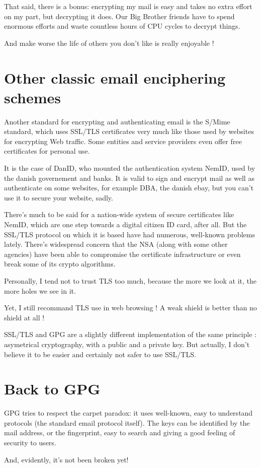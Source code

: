 That said, there is a bonus: encrypting my mail is easy and takes no
extra effort on my part, but decrypting it does. Our Big Brother friends
have to spend enormous efforts and waste countless hours of CPU cycles
to decrypt things.

\begin{quoting}
And make worse the life of others you don't like is really enjoyable !
\end{quoting}

\section{Other classic email enciphering schemes}\label{other-classic-email-enciphering-schemes}

Another standard for encrypting and authenticating email is the S/Mime standard, which uses SSL/TLS certificates very much like those used by
websites for encrypting Web traffic. Some entities and service providers even offer free certificates for personal use.

It is the case of DanID, who mounted the authentication system NemID, used by the danish governement and banks. It is valid to sign and
encrypt mail as well as authenticate on some websites, for example DBA, the danish ebay, but you can't use it to secure your website, sadly.

There's much to be said for a nation-wide system of secure certificates like NemID, which are one step towards a digital citizen ID card, after
all. But the SSL/TLS protocol on which it is based have had numerous, well-known problems lately. There's widespread concern that the NSA
(along with some other agencies) have been able to compromise the certificate infrastructure or even break some of its crypto algorithms.

Personally, I tend not to trust TLS too much, because the more we look at it, the more holes we see in it.

\begin{notice}
	Yet, I still recommand TLS use in web browsing ! A weak shield is better than no shield at all !
\end{notice}

SSL/TLS and GPG are a slightly different implementation of the same principle : asymetrical cryptography, with a public and a private key.
But actually, I don't believe it to be easier and certainly not safer to use SSL/TLS.

\section{Back to GPG}\label{back-to-gpg}

GPG tries to respect the carpet paradox: it uses well-known, easy to understand protocols (the standard email protocol itself). The keys can
be identified by the mail address, or the fingerprint, easy to search and giving a good feeling of security to users.

And, evidently, it's not been broken yet!